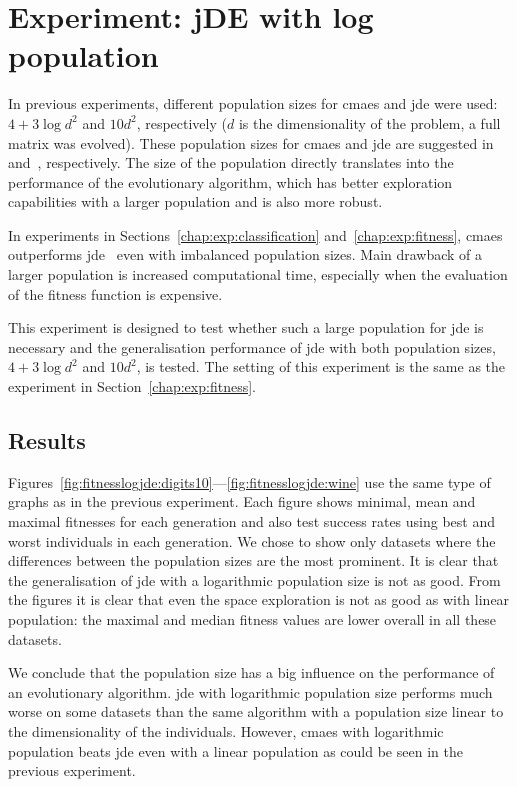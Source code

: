 \documentclass[12pt,a4paper]{report}
\begin{document}
\section{Experiment: jDE with log population} \label{chap:exp:logjde}
In previous experiments, different population sizes for \ac{cmaes} and \ac{jde} were used: $4+3\log{d^2}$ and $10d^2$, respectively ($d$ is the dimensionality of the problem, a full matrix was evolved). These population sizes for \ac{cmaes} and \ac{jde} are suggested in~\citep{hansen2001completely} and~\citep{brest2006self}, respectively. The size of the population directly translates into the performance of the evolutionary algorithm, which has better exploration capabilities with a larger population and is also more robust.

In experiments in Sections~\ref{chap:exp:classification} and~\ref{chap:exp:fitness}, \ac{cmaes} outperforms \ac{jde}~\citep{fukui2013evolutionary} even with imbalanced population sizes. Main drawback of a larger population is increased computational time, especially when the evaluation of the fitness function is expensive.

This experiment is designed to test whether such a large population for \ac{jde} is necessary and the generalisation performance of \ac{jde} with both population sizes, $4+3\log{d^2}$ and $10d^2$, is tested. The setting of this experiment is the same as the experiment in Section~\ref{chap:exp:fitness}.

\subsection{Results}

Figures~\ref{fig:fitnesslogjde:digits10}---\ref{fig:fitnesslogjde:wine} use the same type of graphs as in the previous experiment. Each figure shows minimal, mean and maximal fitnesses for each generation and also test success rates using best and worst individuals in each generation. We chose to show only datasets where the differences between the population sizes are the most prominent. It is clear that the generalisation of \ac{jde} with a logarithmic population size is not as good. From the figures it is clear that even the space exploration is not as good as with linear population: the maximal and median fitness values are lower overall in all these datasets.

We conclude that the population size has a big influence on the performance of an evolutionary algorithm. \ac{jde} with logarithmic population size performs much worse on some datasets than the same algorithm with a population size linear to the dimensionality of the individuals. However, \ac{cmaes} with logarithmic population beats \ac{jde} even with a linear population as could be seen in the previous experiment.
\end{document}
